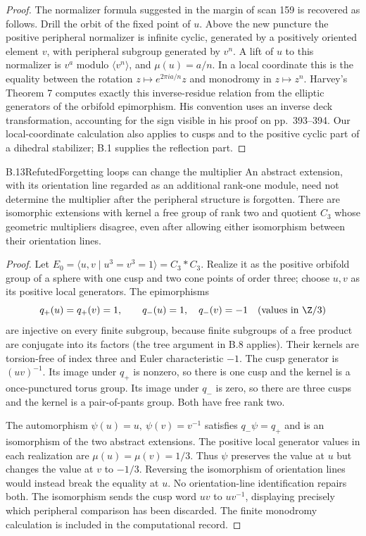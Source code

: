 \begin{proof}
The normalizer formula suggested in the margin of scan 159 is recovered as
follows. Drill the orbit of the fixed point of $u$. Above the new puncture the
positive peripheral normalizer is infinite cyclic, generated by a positively
oriented element $v$, with peripheral subgroup generated by $v^n$. A lift of
$u$ to this normalizer is $v^a$ modulo $\langle v^n\rangle$, and
$\mu(u)=a/n$. In a local coordinate this is the equality between the rotation
$z\mapsto e^{2\pi ia/n}z$ and monodromy in $z\mapsto z^n$. Harvey's Theorem 7
\cite{bHarvey1971} computes exactly this inverse-residue relation from the
elliptic generators of the orbifold epimorphism. His convention uses an inverse
deck transformation, accounting for the sign visible in his proof on
pp.~393--394. Our local-coordinate calculation also applies to cusps and to the
positive cyclic part of a dihedral stabilizer; B.1 supplies the reflection part.
\end{proof}

\begin{claim}{B.13}{Refuted}{Forgetting loops can change the multiplier}
An abstract extension, with its orientation line regarded as an additional
rank-one module, need not determine the multiplier after the peripheral
structure is forgotten. There are isomorphic extensions with kernel a free
group of rank two and quotient $C_3$ whose geometric multipliers disagree,
even after allowing either isomorphism between their orientation lines.
\end{claim}
\begin{proof}
Let $E_0=\langle u,v\mid u^3=v^3=1\rangle=C_3*C_3$. Realize it as the
positive orbifold group of a sphere with one cusp and two cone points of order
three; choose $u,v$ as its positive local generators. The epimorphisms
\[
 q_+(u)=q_+(v)=1,\qquad q_-(u)=1,\quad q_-(v)=-1
 \quad (\text{values in }\Z/3)
\]
are injective on every finite subgroup, because finite subgroups of a free
product are conjugate into its factors (the tree argument in B.8 applies).
Their kernels are torsion-free of index three and Euler characteristic $-1$.
The cusp generator is $(uv)^{-1}$. Its image under $q_+$ is nonzero, so there
is one cusp and the kernel is a once-punctured torus group. Its image under
$q_-$ is zero, so there are three cusps and the kernel is a pair-of-pants group.
Both have free rank two.

The automorphism $\psi(u)=u,\ \psi(v)=v^{-1}$ satisfies $q_-\psi=q_+$ and
is an isomorphism of the two abstract extensions. The positive local generator
values in each realization are $\mu(u)=\mu(v)=1/3$. Thus $\psi$ preserves the
value at $u$ but changes the value at $v$ to $-1/3$. Reversing the isomorphism
of orientation lines would instead break the equality at $u$. No orientation-line
identification repairs both. The isomorphism sends the cusp word $uv$ to
$uv^{-1}$, displaying precisely which peripheral comparison has been discarded.
The finite monodromy calculation is included in the computational record.
\end{proof}

